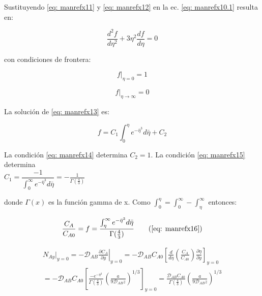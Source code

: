 Sustituyendo \eqref{eq: manrefx11} y \eqref{eq: manrefx12} en la ec. \eqref{eq: manrefx10.1} resulta en:

\begin{equation} \label{eq: manrefx13}
	\frac{d^2 f}{d \eta^2} + 3 \eta^2 \frac{df}{d \eta} = 0
\end{equation}

con condiciones de frontera:

\begin{equation} \label{eq: manrefx14}
	f|_{\eta = 0} = 1
\end{equation}

\begin{equation} \label{eq: manrefx15}
	f|_{\eta \to \infty} = 0
\end{equation}

La solución de \eqref{eq: manrefx13} es:

\begin{equation} \label{eq: manrefx16}
	f = C_1 \int_0^\eta e^{-\bar{\eta}^3} d \bar{\eta} + C_2
\end{equation}

La condición \eqref{eq: manrefx14} determina $C_2 = 1$. La condición \eqref{eq: manrefx15} determina \\ $C_1 = \dfrac{-1}{\int_0^\infty e^{-\bar{\eta}^3} d \bar{\eta}} = - \frac{1}{\Gamma (\frac{4}{3})}$ 

donde $\Gamma (x)$ es la función gamma de x. Como $\int_0^\eta = \int_0^\infty - \int_\eta^\infty$ entonces:

\begin{equation} \label{eq: manrefx16.1}
	\frac{C_A}{C_{A0}} = f =  \frac{\int_\eta^\infty e^{-\bar{\eta}^3} d\bar{\eta}}{\Gamma(\frac{4}{3})}
	\tag{\ref{eq: manrefx16}}
\end{equation}

\begin{equation}
	\begin{split}
	N_{Ay}|_{y=0} = - \mathcal{D}_{AB} \left.  \frac{\partial C_A}{\partial y} \right|_{y=0} = - \mathcal{D}_{AB} C_{A0} \left[ \frac{d}{d\eta} \left( \frac{C_A}{C_{A0}} \right) \frac{\partial \eta}{\partial y} \right]_{y=0} 
	\\
  = -\mathcal{D}_{AB} C_{A0} \left[ \frac{- e^{-\eta^3}}{\Gamma(\frac{4}{3})} \left( \frac{a}{9 \mathcal{D}_{AB}z} \right)^{1/3} \right]_{y=0} = \frac{\mathcal{D}_{AB} C_{A0}}{\Gamma (\frac{4}{3})} \left( \frac{a}{9 \mathcal{D}_{AB} z} \right)^{1/3}
	\end{split}
\end{equation}


